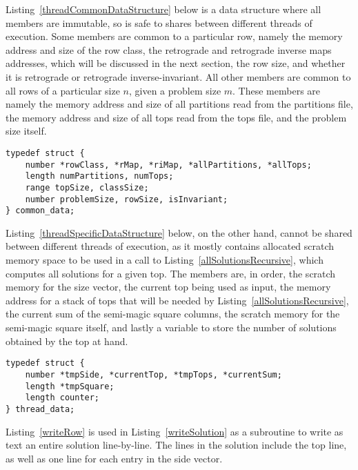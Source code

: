 Listing~\ref{threadCommonDataStructure} below is a data structure where all members are immutable, so is safe to shares between different threads of execution. Some members are common to a particular row, namely the memory address and size of the row class, the retrograde and retrograde inverse maps addresses, which will be discussed in the next section, the row size, and whether it is retrograde or retrograde inverse-invariant. All other members are common to all rows of a particular size $n$, given a problem size $m$. These members are namely the memory address and size of all partitions read from the partitions file, the memory address and size of all tops read from the tops file, and the problem size itself.

\begin{lstlisting}[caption={Defining a data structure to hold thread-common data.},label={threadCommonDataStructure}]
typedef struct {
    number *rowClass, *rMap, *riMap, *allPartitions, *allTops;
    length numPartitions, numTops;
    range topSize, classSize;
    number problemSize, rowSize, isInvariant;
} common_data;
\end{lstlisting}

Listing~\ref{threadSpecificDataStructure} below, on the other hand, cannot be shared between different threads of execution, as it mostly contains allocated scratch memory space to be used in a call to Listing~\ref{allSolutionsRecursive}, which computes all solutions for a given top. The members are, in order, the scratch memory for the size vector, the current top being used as input, the memory address for a stack of tops that will be needed by Listing~\ref{allSolutionsRecursive}, the current sum of the semi-magic square columns, the scratch memory for the semi-magic square itself, and lastly a variable to store the number of solutions obtained by the top at hand.

\begin{lstlisting}[caption={Defining a data structure to hold thread-specific data.},label={threadSpecificDataStructure}]
typedef struct {
    number *tmpSide, *currentTop, *tmpTops, *currentSum;
    length *tmpSquare;
    length counter;
} thread_data;
\end{lstlisting}

Listing~\ref{writeRow} is used in Listing~\ref{writeSolution} as a subroutine to write as text an entire solution line-by-line. The lines in the solution include the top line, as well as one line for each entry in the side vector.


